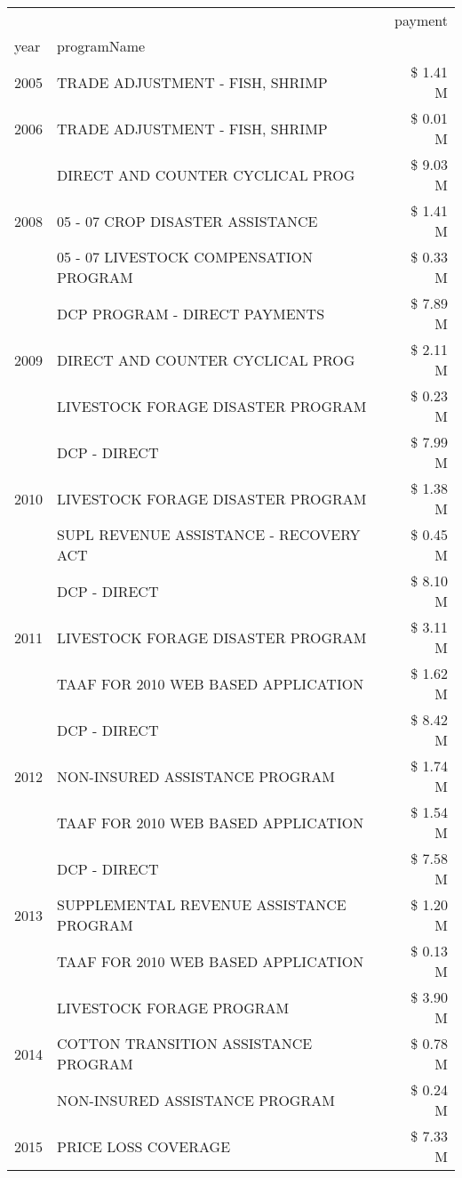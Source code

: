 \begin{tabular}{llr}
\toprule
 &  & payment \\
year & programName &  \\
\midrule
2005 & TRADE ADJUSTMENT - FISH, SHRIMP & \$ 1.41 M \\
\cline{1-3}
2006 & TRADE ADJUSTMENT - FISH, SHRIMP & \$ 0.01 M \\
\cline{1-3}
\multirow[t]{3}{*}{2008} & DIRECT AND COUNTER CYCLICAL PROG & \$ 9.03 M \\
 & 05 - 07 CROP DISASTER ASSISTANCE & \$ 1.41 M \\
 & 05 - 07 LIVESTOCK COMPENSATION PROGRAM & \$ 0.33 M \\
\cline{1-3}
\multirow[t]{3}{*}{2009} & DCP PROGRAM - DIRECT PAYMENTS & \$ 7.89 M \\
 & DIRECT AND COUNTER CYCLICAL PROG & \$ 2.11 M \\
 & LIVESTOCK FORAGE DISASTER  PROGRAM & \$ 0.23 M \\
\cline{1-3}
\multirow[t]{3}{*}{2010} & DCP - DIRECT & \$ 7.99 M \\
 & LIVESTOCK FORAGE DISASTER PROGRAM & \$ 1.38 M \\
 & SUPL REVENUE ASSISTANCE - RECOVERY ACT & \$ 0.45 M \\
\cline{1-3}
\multirow[t]{3}{*}{2011} & DCP - DIRECT & \$ 8.10 M \\
 & LIVESTOCK FORAGE DISASTER PROGRAM & \$ 3.11 M \\
 & TAAF FOR 2010 WEB BASED APPLICATION & \$ 1.62 M \\
\cline{1-3}
\multirow[t]{3}{*}{2012} & DCP - DIRECT & \$ 8.42 M \\
 & NON-INSURED ASSISTANCE PROGRAM & \$ 1.74 M \\
 & TAAF FOR 2010 WEB BASED APPLICATION & \$ 1.54 M \\
\cline{1-3}
\multirow[t]{3}{*}{2013} & DCP - DIRECT & \$ 7.58 M \\
 & SUPPLEMENTAL REVENUE ASSISTANCE PROGRAM & \$ 1.20 M \\
 & TAAF FOR 2010 WEB BASED APPLICATION & \$ 0.13 M \\
\cline{1-3}
\multirow[t]{3}{*}{2014} & LIVESTOCK FORAGE PROGRAM & \$ 3.90 M \\
 & COTTON TRANSITION ASSISTANCE PROGRAM & \$ 0.78 M \\
 & NON-INSURED ASSISTANCE PROGRAM & \$ 0.24 M \\
\cline{1-3}
\multirow[t]{3}{*}{2015} & PRICE LOSS COVERAGE & \$ 7.33 M \\

\end{tabular}
